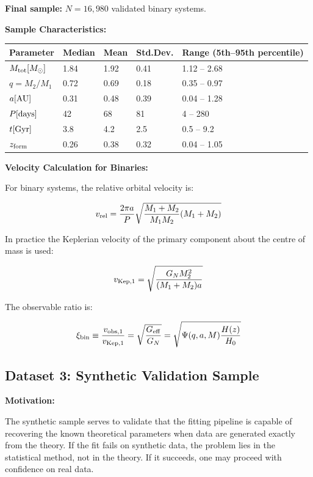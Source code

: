 \documentclass[10pt,a4paper]{article}
\begin{document}
\textbf{Final sample:} \(N = 16,980\) validated binary systems.

\textbf{Sample Characteristics:}

\begin{longtable}[]{@{}lllll@{}}
\toprule\noalign{}
Parameter & Median & Mean & Std.Dev. & Range (5th--95th percentile) \\
\midrule\noalign{}
\endhead
\bottomrule\noalign{}
\endlastfoot
\(M_{\rm tot} [M_\odot]\) & 1.84 & 1.92 & 0.41 & 1.12 -- 2.68 \\
\(q = M_2/M_1\) & 0.72 & 0.69 & 0.18 & 0.35 -- 0.97 \\
\(a [\rm AU]\) & 0.31 & 0.48 & 0.39 & 0.04 -- 1.28 \\
\(P [\rm days]\) & 42 & 68 & 81 & 4 -- 280 \\
\(t [{\rm Gyr}]\) & 3.8 & 4.2 & 2.5 & 0.5 -- 9.2 \\
\(z_{\rm form}\) & 0.26 & 0.38 & 0.32 & 0.04 -- 1.05 \\
\end{longtable}

\textbf{Velocity Calculation for Binaries:}

For binary systems, the relative orbital velocity is:

\[v_{\rm rel} = \frac{2\pi a}{P}\sqrt{\frac{M_1 + M_2}{M_1 M_2}(M_1 + M_2)}\]

In practice the Keplerian velocity of the primary component about the
centre of mass is used:

\[v_{\rm Kep,1} = \sqrt{\frac{G_N M_2^2}{(M_1+M_2)a}}\]

The observable ratio is:

\[\xi_{\rm bin} \equiv \frac{v_{\rm obs,1}}{v_{\rm Kep,1}} = \sqrt{\frac{G_{\rm eff}}{G_N}} = \sqrt{\Psi(q,a,M) \frac{H(z)}{H_0}}\]

\subsection{Dataset 3: Synthetic Validation
Sample}\label{dataset-3-synthetic-validation-sample}

\textbf{Motivation:}

The synthetic sample serves to validate that the fitting pipeline is
capable of recovering the known theoretical parameters when data are
generated exactly from the theory. If the fit fails on synthetic data,
the problem lies in the statistical method, not in the theory. If it
succeeds, one may proceed with confidence on real data.
\end{document}
